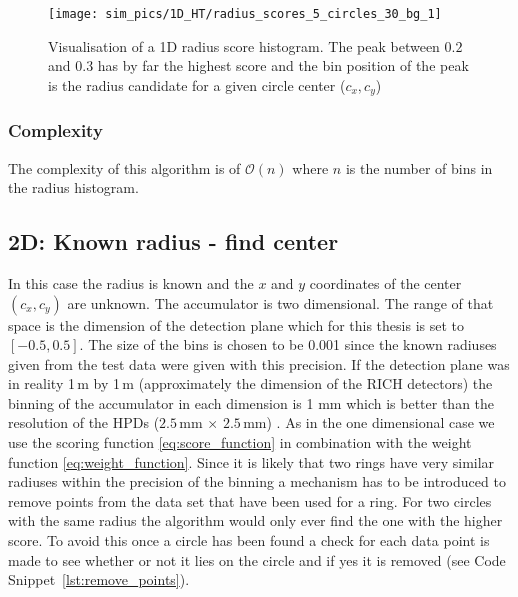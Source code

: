 \documentclass[11pt]{scrreprt}
\begin{document}
\begin{figure}[tb]
  \centering
  \texttt{[image: sim\_pics/1D\_HT/radius\_scores\_5\_circles\_30\_bg\_1]}
  \caption[Graph visualisation of a 1D radius histogram]{Visualisation of a 1D radius score histogram. The peak between $0.2$ 
  and $0.3$ has by far the highest score and the bin
  position of the peak is the radius candidate for a given circle center ($c_x, c_y$)}
  \label{fig:1d_ht_radius_score}
\end{figure}

\subsubsection{Complexity} %
The complexity of this algorithm is of $\mathcal{O}(n)$ where $n$ is the number of bins in the radius histogram.
\label{ssub:complexity_1d}


\subsection{2D: Known radius - find center} %
\label{sub:2d_known_radius_find_center}
In this case the radius is known and the $x$ and $y$ coordinates of the center $(c_x, c_y)$ are unknown. The accumulator is two 
dimensional. The range of that space is the dimension of the detection plane which for this thesis is set to $[-0.5,0.5]$. The size of the 
bins is chosen to be 0.001 since the known radiuses given from the test data were given with this precision. If the detection plane was in 
reality 1\,m by 1\,m (approximately the dimension of the RICH detectors) the binning of the accumulator in each dimension is 1 mm which is
better than the resolution of the HPDs ($2.5$\,mm $\times$ $2.5$\,mm) . As in the one dimensional case we use the scoring function 
\ref{eq:score_function} in combination with the weight function \ref{eq:weight_function}.
Since it is likely that two rings have very similar radiuses within the precision of the binning a mechanism has to be introduced to
remove points from the data set that have been used for a ring. For two circles with the same radius the algorithm would only ever find 
the one with the higher score. To avoid this once a circle has been found a check for each data point is made to see whether or not it 
lies on the circle and if yes it is removed (see Code Snippet~\ref{lst:remove_points}).
\end{document}
